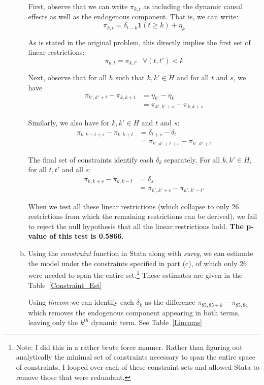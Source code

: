 \documentclass[11pt]{article}
\begin{document}
\begin{enumerate}[1)]
\begin{enumerate}[(a)]
		First, observe that we can write $\pi_{k,t}$ as including the dynamic causal effects as well as the endogenous component. That is, we can write:
		\[\pi_{k,t} = \delta_{t-k}\mathbf{1}(t \geq k) + \eta_k \]

		As is stated in the original problem, this directly implies the first set of linear restrictions:
		\[\pi_{k,t} = \pi_{k,t'} \mbox{ } \forall (t,t') < k\]

		Next, observe that for all $h$ such that $k, k' \in H$ and for all $t$ and $s$, we have
		\begin{align*}
			\pi_{k',k'+t} - \pi_{k,k+t} & = \eta_{k'} - \eta_{k} \\
			& = \pi_{k',k'+s} - \pi_{k,k+s}
		\end{align*}

		Similarly, we also have for $k,k'\in H$ and $t$ and $s$:
		\begin{align*}
			\pi_{k,k+t+s} - \pi_{k,k+t} & = \delta_{t+s} - \delta_{t} \\
            & = \pi_{k',k'+t+s} - \pi_{k',k'+t}
		\end{align*}

		The final set of constraints identify each $\delta_k$ separately. For all $k,k' \in H$, for all $t,t'$ and all $s$:
		\begin{align*}
			\pi_{k,k+s} - \pi_{k,k-t} & = \delta_{s} \\
			& = \pi_{k',k'+s} - \pi_{k',k'-t'}
		\end{align*}

		When we test all these linear restrictions (which collapse to only 26 restrictions from which the remaining restrictions can be derived), we fail to reject the null hypothesis that all the linear restrictions hold. \textbf{The p-value of this test is 0.5866}.



		\item Using the \textit{constraint} function in Stata along with \textit{sureg}, we can estimate the model under the constraints specified in part (c), of which only 26 were needed to span the entire set.\footnote{Note: I did this in a rather brute force manner. Rather than figuring out analytically the minimal set of constraints necessary to span the entire space of constraints, I looped over each of these constraint sets and allowed Stata to remove those that were redundant.} These estimates are given in the Table~\ref{Constraint_Est}

		Using \textit{lincom} we can identify each $\delta_k$ as the difference $\pi_{85,85+k}-\pi_{85,84}$ which removes the endogenous component appearing in both terms, leaving only the $k^{th}$ dynamic term. See Table~\ref{Lincoms}
		

\end{enumerate}
\end{enumerate}
\end{document}
